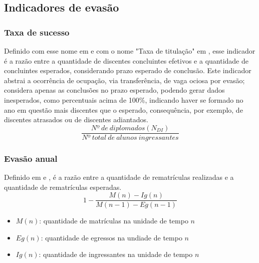\documentclass{report}
\begin{document}
\subsection{Indicadores de evasão}

\subsubsection{Taxa de sucesso}

Definido com esse nome em \cite{indicadores_TCU} e com o nome "Taxa de titulação" em \cite{mudanca_calculos}, esse indicador é a razão entre a quantidade de discentes concluintes efetivos e a quantidade de concluintes esperados, considerando prazo esperado de conclusão.
Este indicador abstrai a ocorrência de ocupação, via transferência, de vaga ociosa por evasão; considera apenas as conclusões no prazo esperado, podendo gerar dados inesperados, como percentuais acima de 100\%, indicando haver se formado no ano em questão mais discentes que o esperado, consequência, por exemplo, de discentes atrasados ou de discentes adiantados.
\begin{equation}
\frac{Nº\ de\ diplomados(N_{DI})}{Nº\ total\ de\ alunos\ ingressantes}
\end{equation}

\subsubsection{Evasão anual}

Definido em \cite{esclarecimentos_calculos} e \cite{mudanca_calculos}, é a razão entre a quantidade de rematrículas realizadas e a quantidade de rematrículas esperadas.
\begin{equation}
1 - \frac{M(n) - Ig(n)}{M(n-1) - Eg(n-1)}
\end{equation}
\begin{itemize}
\item $M(n)$: quantidade de matrículas na unidade de tempo $n$
\item $Eg(n)$: quantidade de egressos na undiade de tempo $n$
\item $Ig(n)$: quantidade de ingressantes na unidade de tempo $n$
\end{itemize}
\end{document}
